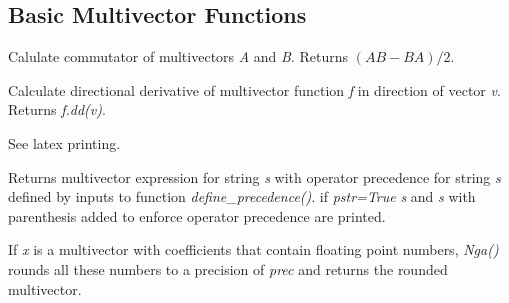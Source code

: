 \documentclass[letterpaper,10pt,english]{sphinxmanual}
\begin{document}
\subsection{Basic Multivector Functions}
\label{GA:basic-multivector-functions}

\begin{fulllineitems}
\label{GA:Com}
Calulate commutator of multivectors \emph{A} and \emph{B}.  Returns $(AB-BA)/2$.

\end{fulllineitems}


\begin{fulllineitems}
\label{GA:DD}
Calculate directional derivative of multivector function \emph{f} in direction of
vector \emph{v}.  Returns \emph{f.dd(v)}.

\end{fulllineitems}


\begin{fulllineitems}
\label{GA:Format}
See latex printing.

\end{fulllineitems}


\begin{fulllineitems}
Returns multivector expression for string \emph{s} with operator precedence for
string \emph{s} defined by inputs to function \emph{define\_precedence()}.  if \emph{pstr=True}
\emph{s} and \emph{s} with parenthesis added to enforce operator precedence are printed.

\end{fulllineitems}


\begin{fulllineitems}
\label{GA:Nga}
If \emph{x} is a multivector with coefficients that contain floating point numbers, \emph{Nga()}
rounds all these numbers to a precision of \emph{prec} and returns the rounded multivector.

\end{fulllineitems}
\end{document}
